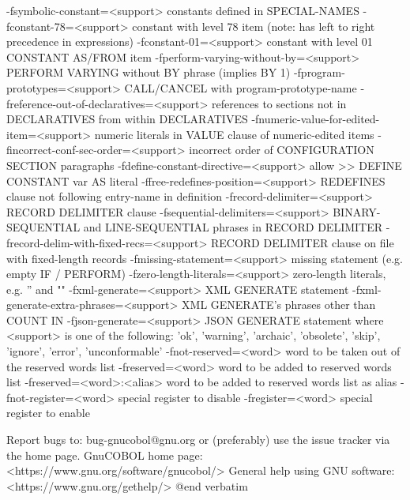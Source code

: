   -fsymbolic-constant=<support>	constants defined in SPECIAL-NAMES
  -fconstant-78=<support>	constant with level 78 item (note: has left to right precedence in expressions)
  -fconstant-01=<support>	constant with level 01 CONSTANT AS/FROM item
  -fperform-varying-without-by=<support>	PERFORM VARYING without BY phrase (implies BY 1)
  -fprogram-prototypes=<support>	CALL/CANCEL with program-prototype-name
  -freference-out-of-declaratives=<support>	references to sections not in DECLARATIVES from within DECLARATIVES
  -fnumeric-value-for-edited-item=<support>	numeric literals in VALUE clause of numeric-edited items
  -fincorrect-conf-sec-order=<support>	incorrect order of CONFIGURATION SECTION paragraphs
  -fdefine-constant-directive=<support>	allow >> DEFINE CONSTANT var AS literal
  -ffree-redefines-position=<support>	REDEFINES clause not following entry-name in definition
  -frecord-delimiter=<support>	RECORD DELIMITER clause
  -fsequential-delimiters=<support>	BINARY-SEQUENTIAL and LINE-SEQUENTIAL phrases in RECORD DELIMITER
  -frecord-delim-with-fixed-recs=<support>	RECORD DELIMITER clause on file with fixed-length records
  -fmissing-statement=<support>	missing statement (e.g. empty IF / PERFORM)
  -fzero-length-literals=<support>	zero-length literals, e.g. '' and ""
  -fxml-generate=<support>	XML GENERATE statement
  -fxml-generate-extra-phrases=<support>	XML GENERATE's phrases other than COUNT IN
  -fjson-generate=<support>	JSON GENERATE statement
	where <support> is one of the following:
	'ok', 'warning', 'archaic', 'obsolete', 'skip', 'ignore', 'error', 'unconformable'
  -fnot-reserved=<word>  word to be taken out of the reserved words list
  -freserved=<word>      word to be added to reserved words list
  -freserved=<word>:<alias>	word to be added to reserved words list as alias
  -fnot-register=<word>  special register to disable
  -fregister=<word>      special register to enable


Report bugs to: bug-gnucobol@gnu.org
or (preferably) use the issue tracker via the home page.
GnuCOBOL home page: <https://www.gnu.org/software/gnucobol/>
General help using GNU software: <https://www.gnu.org/gethelp/>
@end verbatim

